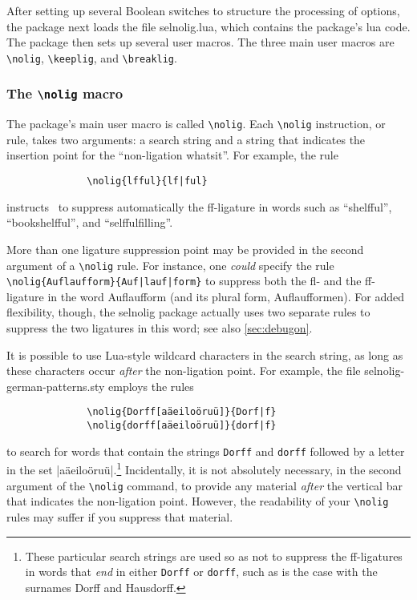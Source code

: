 \documentclass[11pt]{article}
\newcommand{\pkg}[1]{\textsf{#1}}
\newcommand{\opt}[1]{\texttt{#1}}
\newcommand{\cmmd}[1]{\texttt{\textbackslash #1}}
\begin{document}
After setting up several Boolean switches to structure the processing of options, the package next loads the file \pkg{selnolig.lua}, which contains the package's lua code. The package then sets up several user macros. The three main user macros are \cmmd{nolig}, \cmmd{keeplig}, and \cmmd{breaklig}.



\subsubsection{The \cmmd{nolig} macro}
\label{sec:nolig}

\enlargethispage{0.3\baselineskip}

The package's main user macro is called \cmmd{nolig}. Each \cmmd{nolig} instruction, or rule, takes two arguments: a search string and a string that indicates the insertion point for the \enquote{non-ligation whatsit}. For example, the rule
\begin{Verbatim}
              \nolig{lfful}{lf|ful}
\end{Verbatim}
instructs \LuaLaTeX\ to suppress automatically the ff-ligature in words such as \enquote{shelfful}, \enquote{bookshelfful}, and \enquote{selffulfilling}. 

More than one ligature suppression point may be provided in the second argument of a \cmmd{nolig} rule. For instance, one \emph{could} specify the rule \Verb+\nolig{Auflaufform}{Auf|lauf|form}+ to suppress both the fl- and the ff-ligature in the word Auflaufform (and its plural form, Auflaufformen). For added flexibility, though, the \pkg{selnolig} package actually uses two separate rules to suppress the two ligatures in this word; see also \cref{sec:debugon}.


It is possible to use Lua-style wildcard characters in the search string, as long as these characters occur \emph{after} the non-ligation point. For example, the file \pkg{selnolig-german-patterns.sty} employs the rules 
\begin{Verbatim}
              \nolig{Dorff[aäeiloöruü]}{Dorf|f}
              \nolig{dorff[aäeiloöruü]}{dorf|f}
\end{Verbatim}
to search for words that contain the strings \opt{Dorff} and \opt{dorff} followed by a letter in the set |aäeiloöruü|.\footnote{These particular search strings are used so as not to suppress the ff-ligatures in words that \emph{end} in either \opt{Dorff} or \opt{dorff}, such as is the case with the surnames Dorff and Hausdorff.} Incidentally, it is not absolutely necessary, in the second argument of the \cmmd{nolig} command, to provide any material \emph{after} the vertical bar that indicates the non-ligation point. However, the readability of your \cmmd{nolig} rules may suffer if you suppress that material.
\end{document}
